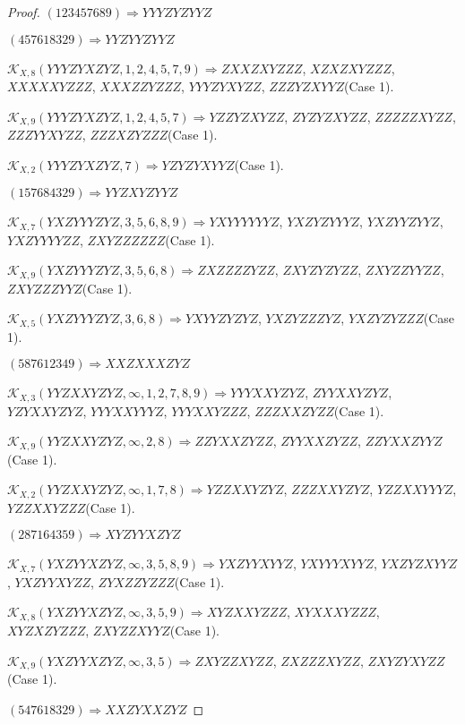 \documentclass[12pt]{article}
\theoremstyle{plain}
\theoremstyle{definition}
\theoremstyle{remark}
\newcommand{\fancy}[1]{\mathcal{#1}}
\def\K{\fancy{K}}
\begin{document}
\begin{proof}
	$(1 2 3 4 5 7 6 8 9)\Rightarrow YYYZYZYYZ$
	
	$(4 5 7 6 1 8 3 2 9)\Rightarrow YYZYYZYYZ$
	
	
	
	$\K_{X,8}(YYYZYXZYZ,1, 2, 4, 5, 7, 9)\Rightarrow $$ZXXZXYZZZ$, $XZXZXYZZZ$, $XXXXXYZZZ$, $XXXZZYZZZ$, $YYYZYXYZZ$, $ZZZYZXYYZ$(Case 1).
	
	$\K_{X,9}(YYYZYXZYZ,1, 2, 4, 5, 7)\Rightarrow $$YZZYZXYZZ$, $ZYZYZXYZZ$, $ZZZZZXYZZ$, $ZZZYYXYZZ$, $ZZZXZYZZZ$(Case 1).
	
	$\K_{X,2}(YYYZYXZYZ,7)\Rightarrow $$YZYZYXYYZ$(Case 1).
	
	
	
	$(1 5 7 6 8 4 3 2 9)\Rightarrow YYZXYZYYZ$
	
	
	
	$\K_{X,7}(YXZYYYZYZ,3, 5, 6, 8, 9)\Rightarrow $$YXYYYYYYZ$, $YXZYZYYYZ$, $YXZYYZYYZ$, $YXZYYYYZZ$, $ZXYZZZZZZ$(Case 1).
	
	$\K_{X,9}(YXZYYYZYZ,3, 5, 6, 8)\Rightarrow $$ZXZZZZYZZ$, $ZXYZYZYZZ$, $ZXYZZYYZZ$, $ZXYZZZYYZ$(Case 1).
	
	$\K_{X,5}(YXZYYYZYZ,3, 6, 8)\Rightarrow $$YXYYZYZYZ$, $YXZYZZZYZ$, $YXZYZYZZZ$(Case 1).
	
	
	
	$(5 8 7 6 1 2 3 4 9)\Rightarrow XXZXXXZYZ$
	
	
	
	$\K_{X,3}(YYZXXYZYZ,\infty,1, 2, 7, 8, 9)\Rightarrow $$YYYXXYZYZ$, $ZYYXXYZYZ$, $YZYXXYZYZ$, $YYYXXYYYZ$, $YYYXXYZZZ$, $ZZZXXZYZZ$(Case 1).
	
	$\K_{X,9}(YYZXXYZYZ,\infty,2, 8)\Rightarrow $$ZZYXXZYZZ$, $ZYYXXZYZZ$, $ZZYXXZYYZ$(Case 1).
	
	$\K_{X,2}(YYZXXYZYZ,\infty,1, 7, 8)\Rightarrow $$YZZXXYZYZ$, $ZZZXXYZYZ$, $YZZXXYYYZ$, $YZZXXYZZZ$(Case 1).
	
	
	
	$(2 8 7 1 6 4 3 5 9)\Rightarrow XYZYYXZYZ$
	
	
	
	$\K_{X,7}(YXZYYXZYZ,\infty,3, 5, 8, 9)\Rightarrow $$YXZYYXYYZ$, $YXYYYXYYZ$, $YXZYZXYYZ$, $YXZYYXYZZ$, $ZYXZZYZZZ$(Case 1).
	
	$\K_{X,8}(YXZYYXZYZ,\infty,3, 5, 9)\Rightarrow $$XYZXXYZZZ$, $XYXXXYZZZ$, $XYZXZYZZZ$, $ZXYZZXYYZ$(Case 1).
	
	$\K_{X,9}(YXZYYXZYZ,\infty,3, 5)\Rightarrow $$ZXYZZXYZZ$, $ZXZZZXYZZ$, $ZXYZYXYZZ$(Case 1).
	
	
	
	$(5 4 7 6 1 8 3 2 9)\Rightarrow XXZYXXZYZ$
	

\end{proof}
\end{document}
